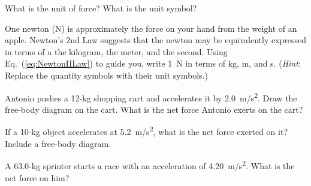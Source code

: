 \documentclass[main.tex]{subfiles}
\begin{document}
\begin{center}
\end{center}


\begin{exercise} \label{01Hh51}
What is the unit of force? What is the unit symbol?
\end{exercise}

\begin{exercise} \label{YQwD8z}
One newton (N) is approximately the force on your hand from the weight of an apple. Newton's 2nd Law suggests that the newton may be equivalently expressed in terms of a the kilogram, the meter, and the second.  Using Eq.~(\ref{eq:NewtonIILaw}) to guide you, write \SI{1}{N} in terms of kg, m, and s. (\textit{Hint}: Replace the quantity symbols with their unit symbols.)
\end{exercise}

\begin{exercise} \label{aBCVA3}
Antonio pushes a 12-kg shopping cart and accelerates it by \SI{2.0}{m/s^2}. Draw the free-body diagram on the cart. What is the net force Antonio exerts on the cart?
\end{exercise}

\begin{exercise} \label{Sm9Zw6}
    If a 10-kg object accelerates at \SI{5.2}{m/s^2}, what is the net force exerted on it? Include a free-body diagram.  
\end{exercise}

\begin{exercise} \label{RbjKEg}
    A 63.0-kg sprinter starts a race with an acceleration of \SI{4.20}{m/s^2}. What is the net force on him?
\end{exercise}
\end{document}
